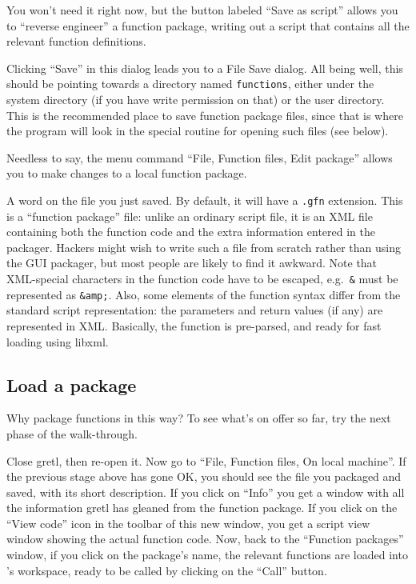 You won't need it right now, but the button labeled ``Save as script''
allows you to ``reverse engineer'' a function package, writing out a
script that contains all the relevant function definitions.

Clicking ``Save'' in this dialog leads you to a File Save dialog.  All
being well, this should be pointing towards a directory named
\texttt{functions}, either under the  system directory (if
you have write permission on that) or the  user directory.
This is the recommended place to save function package files, since
that is where the program will look in the special routine for opening
such files (see below).

Needless to say, the menu command ``File, Function files, Edit package''
allows you to make changes to a local function package.

\vspace{6pt}

A word on the file you just saved.  By default, it will have a
\texttt{.gfn} extension.  This is a ``function package'' file: unlike
an ordinary  script file, it is an XML file containing both
the function code and the extra information entered in the packager.
Hackers might wish to write such a file from scratch rather than using
the GUI packager, but most people are likely to find it awkward.  Note
that XML-special characters in the function code have to be escaped,
e.g.\ \texttt{\&} must be represented as \texttt{\&amp;}.  Also, some
elements of the function syntax differ from the standard script
representation: the parameters and return values (if any) are
represented in XML.  Basically, the function is pre-parsed, and ready
for fast loading using \textsf{libxml}.

\vspace{6pt}

\subsection{Load a package}

Why package functions in this way?  To see what's on offer so far, try
the next phase of the walk-through.

Close gretl, then re-open it.  Now go to ``File, Function files, On
local machine''. If the previous stage above has gone OK, you should
see the file you packaged and saved, with its short description.  If
you click on ``Info'' you get a window with all the information gretl
has gleaned from the function package.  If you click on the ``View
code'' icon in the toolbar of this new window, you get a script view
window showing the actual function code. Now, back to the ``Function
packages'' window, if you click on the package's name, the relevant
functions are loaded into 's workspace, ready to be called
by clicking on the ``Call'' button.

